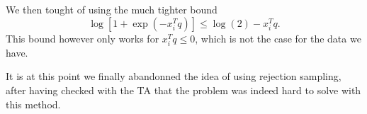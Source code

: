 \documentclass[a4paper, 12pt,oneside]{article}
\begin{document}
		We then tought of using the much tighter bound  
		\begin{equation}
			\log[1+\exp(-x_i^Tq)] \le \log(2) - x_i^Tq.
		\end{equation}
		This bound however only works for $x_i^Tq\le 0$, which is not the case for the data we have. 
		
		It is at this point we finally abandonned the idea of using rejection sampling, after having checked with the TA that the problem was indeed hard to solve with this method.
\end{document}
